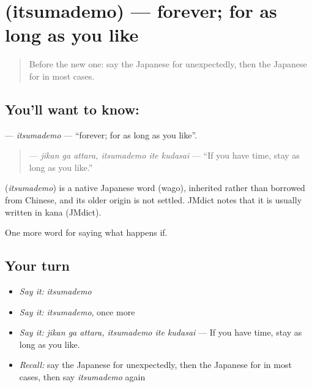 \section[\texorpdfstring{\ja{いつまでも} (itsumademo)}{いつまでも (itsumademo)}]{ (itsumademo) — forever; for as long as you like}

\label{lesson:JA-C356-itsumademo}



\begin{quote}
Before the new one: say the Japanese for unexpectedly, then the Japanese for in most cases.
\end{quote}

\subsection*{You'll want to know: }
\textbf{} — \emph{itsumademo} — \textquotedblleft{}forever; for as long as you like\textquotedblright{}.

\begin{quote}
\textbf{   } — \emph{jikan ga attara, itsumademo ite kudasai} — \textquotedblleft{}If you have time, stay as long as you like.\textquotedblright{}
\end{quote}

\begin{cousinweb}
\textbf{} (\emph{itsumademo}) is a native Japanese word (wago), inherited rather than borrowed from Chinese, and its older origin is not settled. JMdict notes that it is usually written in kana (JMdict).
\end{cousinweb}

\begin{grammarlens}[title={What you've built}]
One more word for saying what happens if.
\end{grammarlens}

\subsection*{Your turn}
\begin{itemize}
\raggedright
  \item \emph{Say it:} \emph{itsumademo}
  \item \emph{Say it:} \emph{itsumademo}, once more
  \item \emph{Say it:} \emph{jikan ga attara, itsumademo ite kudasai} — If you have time, stay as long as you like.
  \item \emph{Recall:} say the Japanese for unexpectedly, then the Japanese for in most cases, then say \emph{itsumademo} again
\end{itemize}


